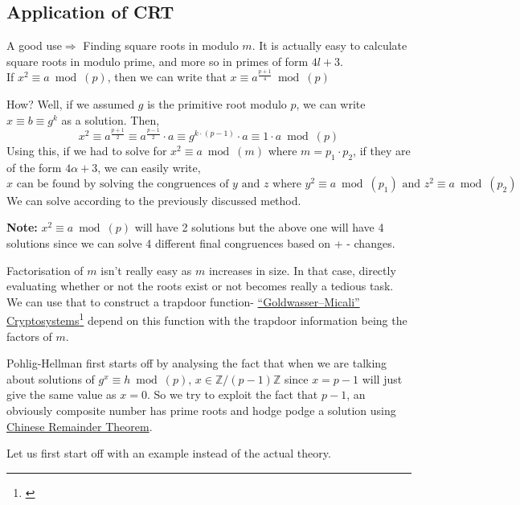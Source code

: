 		\subsection{Application of CRT}			
			A good use\(\Rightarrow\) Finding square roots in modulo $m$. It is actually easy to calculate square roots in modulo prime, and more so in primes of form \(4l + 3\). \\ If \(x^2 \equiv a \bmod(p)\), then we can write that \(x\equiv a^\frac{p+1}{4} \bmod(p)\) \par
			How? Well, if we assumed \(g\) is the primitive root modulo \(p\), we can write \(x \equiv b \equiv g^k\) as a solution. Then, \[x^2 \equiv a^\frac{p+1}{2} \equiv a^\frac{p-1}{2} \cdot a \equiv g^{k \cdot (p-1)}\cdot a \equiv 1 \cdot a \bmod(p) \]
			Using this, if we had to solve for \(x^2 \equiv a \bmod(m)\) where \(m = p_1 \cdot p_2\), if they are of the form \(4\alpha +3\), we can easily write, \[x\text{ can be found by solving the congruences of $y$ and $z$} \text{ where } y^2 \equiv a \bmod(p_1)\text{ and } z^2 \equiv a \bmod(p_2)\] We can solve according to the previously discussed method. \par
			\textbf{Note:} \(x^2 \equiv a \bmod(p)\) will have 2 solutions but the above one will have 4 solutions since we can solve 4 different final congruences based on + - changes.
		\begin{mybox}
			Factorisation of \(m\) isn't really easy as \(m\) increases in size. In that case, directly evaluating whether or not the roots exist or not becomes really a tedious task. We can use that to construct a trapdoor function-  \href{https://bit.ly/3IFyTW7}{``Goldwasser–Micali'' Cryptosystems}\footnote{\cite{IIScGold}} depend on this function with the trapdoor information being the factors of \(m\).
		\end{mybox}

	 \label{sec:pohlig}
		Pohlig-Hellman first starts off by analysing the fact that when we are talking about solutions of \(g^x \equiv h \bmod(p)\), \(x \in \mathbb{Z}/(p-1)\mathbb{Z}\) since \(x = p-1\) will just give the same value as \(x = 0\). So we try to exploit the fact that \(p-1\), an obviously composite number has prime roots and hodge podge a solution using \hyperref[subsec:chinese]{Chinese Remainder Theorem}.\par
		Let us first start off with an example instead of the actual theory. 

